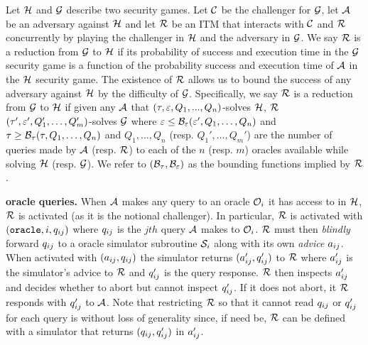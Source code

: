 \begin{definition}
  \label{security-reduction}
  Let $\mathcal{H}$ and $\mathcal{G}$ describe two security games.
  Let $\mathcal{C}$ be the challenger for $\mathcal{G}$, let $\mathcal{A}$ be an adversary against $\mathcal{H}$ and let $\mathcal{R}$ be an ITM that interacts with $\mathcal{C}$ and $\mathcal{R}$ concurrently by playing the challenger in $\mathcal{H}$ and the adversary in $\mathcal{G}$.
  We say $\mathcal{R}$ is a reduction from $\mathcal{G}$ to $\mathcal{H}$ if its probability of success and execution time in the $\mathcal{G}$ security game is a function of the probability success and execution time of $\mathcal{A}$ in the $\mathcal{H}$ security game.
  The existence of $\mathcal{R}$ allows us to bound the success of any adversary against $\mathcal{H}$ by the difficulty of $\mathcal{G}$.
  Specifically, we say $\mathcal{R}$ is a reduction from $\mathcal{G}$ to $\mathcal{H}$ if given any $\mathcal{A}$ that $(\tau, \varepsilon, Q_1,...,Q_n)$-solves $\mathcal{H}$, $\mathcal{R}$ $(\tau', \varepsilon', Q_1',\dots,Q_m')$-solves $\mathcal{G}$ where $\varepsilon \leq \mathcal{B}_\varepsilon(\varepsilon', Q_1,\dots,Q_n) $ and $\tau \geq \mathcal{B}_\tau(\tau, Q_1,\dots,Q_n)$ and $Q_1,\dots,Q_n$ (resp. $Q_1', \dots, Q_m'$) are the number of queries made by $\mathcal{A}$ (resp. $\mathcal{R}$) to each of the $n$ (resp. $m$) oracles available while solving $\mathcal{H}$ (resp. $\mathcal{G}$).
  We refer to $(\mathcal{B}_\tau, \mathcal{B}_\varepsilon)$ as the bounding functions implied by $\mathcal{R}$.

  \textbf{oracle queries.} When $\mathcal{A}$ makes any query to an oracle $\mathcal{O}_i$ it has access to in $\mathcal{H}$, $\mathcal{R}$ is activated (as it is the notional challenger).
  In particular, $\mathcal{R}$ is activated with $(\mathtt{oracle}, i,q_{ij})$ where $q_{ij}$ is the $jth$ query $\mathcal{A}$ makes to $\mathcal{O}_i$.
  $\mathcal{R}$ must then \emph{blindly} forward $q_{ij}$ to a oracle simulator subroutine $\mathcal{S}_i$ along with its own \emph{advice} $a_{ij}$.
  When activated with $(a_{ij}, q_{ij})$ the simulator returns $(a'_{ij}, q'_{ij})$ to $\mathcal{R}$ where $a'_{ij}$ is the simulator's advice to $\mathcal{R}$ and $q'_{ij}$ is the query response.
  $\mathcal{R}$ then inspects $a'_{ij}$ and decides whether to abort but cannot inspect $q'_{ij}$.
  If it does not abort, it $\mathcal{R}$ responds with $q'_{ij}$ to $\mathcal{A}$.
  Note that restricting $\mathcal{R}$ so that it cannot read $q_{ij}$ or $ q'_{ij}$ for each query is without loss of generality since, if need be, $\mathcal{R}$ can be defined with a simulator that returns $(q_{ij},q'_{ij})$ in $a'_{ij}$.


\end{definition}
